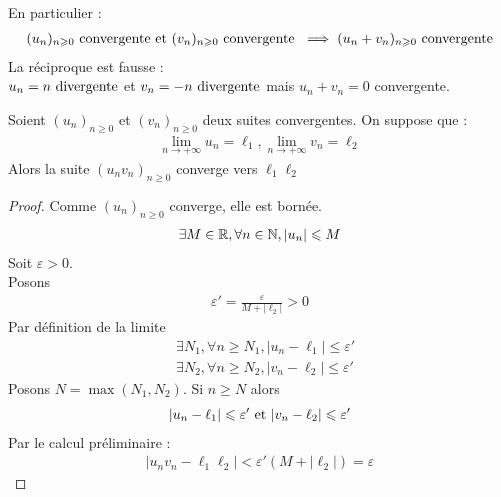 \begin{remarque}
    En particulier : 
    \begin{align*}
        (u_n)_{n \geq 0} \textnormal{ convergente et } (v_n)_{n \geq 0} \textnormal{ convergente } \implies (u_n + v_n)_{n \geq 0} \textnormal{ convergente} 
    \end{align*}
    La réciproque est fausse : \\
    $u_n = n \textnormal{ divergente}$ et $v_n = -n \textnormal{ divergente}$ mais $u_n + v_n = 0$ convergente.
\end{remarque}

\begin{graybox}
    \begin{theoreme}[]
    Soient $(u_n)_{n \geq 0}$ et $(v_n)_{n \geq 0}$ deux suites convergentes. On suppose que :
    \begin{align*}
        \lim_{n \to +\infty} u_n = \ell_1, \lim_{n \to +\infty} v_n = \ell_2
    \end{align*}
    Alors la suite $(u_n v_n)_{n \geq 0}$ converge vers $\ell_1 \ell_2$
\end{theoreme}
\end{graybox}

\begin{proof}
        Comme $(u_n)_{n \geq 0}$ converge, elle est bornée. 
        \begin{align*}
            \exists M \in \R, \forall n \in \N, |u_n| \leq M
        \end{align*}
        Soit $\varepsilon > 0$. \\
        Posons
        \begin{align*}
            \varepsilon' = \frac{\varepsilon}{M + |\ell_2|} > 0
        \end{align*}
        Par définition de la limite 
        \begin{align*}
            &\exists N_1, \forall n \geq N_1, |u_n - \ell_1| \leq \varepsilon' \\
            &\exists N_2, \forall n \geq N_2, |v_n - \ell_2| \leq \varepsilon'  
        \end{align*}
        Posons $N = \max(N_1, N_2)$. Si $n \geq N$ alors 
        \begin{align*}
            |u_n - \ell_1| \leq \varepsilon' \textnormal{ et } |v_n - \ell_2| \leq \varepsilon'
        \end{align*}
        Par le calcul préliminaire :
        \begin{align*}
            |u_n v_n - \ell_1 \ell_2| < \varepsilon' (M + |\ell_2|) = \varepsilon
        \end{align*}
    \end{proof}

